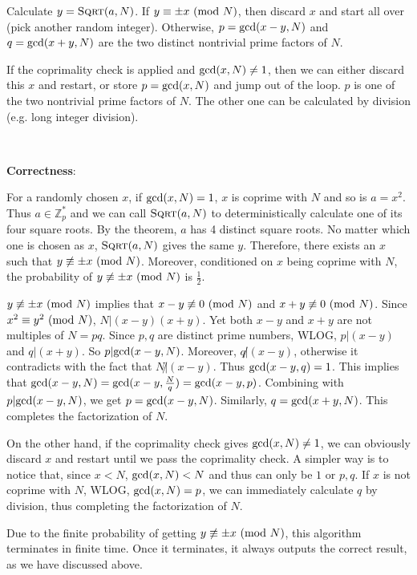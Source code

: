 \documentclass{article}
\begin{document}
Calculate $y=\textsc{Sqrt}(a,N)$. If $y\equiv\pm x\textup{ (mod }N)$, then discard $x$ and start all over (pick another random integer). Otherwise, $p=\textup{gcd}(x-y,N)$ and $q=\textup{gcd}(x+y,N)$ are the two distinct nontrivial prime factors of $N$.

If the coprimality check is applied and $\textup{gcd}(x,N)\neq1$, then we can either discard this $x$ and restart, or store $p=\textup{gcd}(x,N)$ and jump out of the loop. $p$ is one of the two nontrivial prime factors of $N$. The other one can be calculated by division (e.g. long integer division).

~

\noindent\textbf{Correctness}:

For a randomly chosen $x$, if $\textup{gcd}(x,N)=1$, $x$ is coprime with $N$ and so is $a=x^2$. Thus $a\in\mathbb{Z}_p^*$ and we can call $\textsc{Sqrt}(a,N)$ to deterministically calculate one of its four square roots. By the theorem, $a$ has 4 distinct square roots. No matter which one is chosen as $x$, $\textsc{Sqrt}(a,N)$ gives the same $y$. Therefore, there exists an $x$ such that $y\not\equiv\pm x\textup{ (mod }N)$. Moreover, conditioned on $x$ being coprime with $N$, the probability of $y\not\equiv\pm x\textup{ (mod }N)$ is $\frac{1}{2}$.

$y\not\equiv\pm x\textup{ (mod }N)$ implies that $x-y\not\equiv0\textup{ (mod }N)$ and $x+y\not\equiv0\textup{ (mod }N)$. Since $x^2\equiv y^2\textup{ (mod }N)$, $N|(x-y)(x+y)$. Yet both $x-y$ and $x+y$ are not multiples of $N=pq$. Since $p,q$ are distinct prime numbers, WLOG, $p|(x-y)$ and $q|(x+y)$. So $p|\textup{gcd}(x-y,N)$. Moreover, $q\!\!\not|(x-y)$, otherwise it contradicts with the fact that $N\!\!\not|(x-y)$. Thus $\textup{gcd}(x-y,q)=1$. This implies that $\textup{gcd}(x-y,N)=\textup{gcd}(x-y,\frac{N}{q})=\textup{gcd}(x-y,p)$. Combining with $p|\textup{gcd}(x-y,N)$, we get $p=\textup{gcd}(x-y,N)$. Similarly, $q=\textup{gcd}(x+y,N)$. This completes the factorization of $N$.

On the other hand, if the coprimality check gives $\textup{gcd}(x,N)\neq1$, we can obviously discard $x$ and restart until we pass the coprimality check. A simpler way is to notice that, since $x<N$, $\textup{gcd}(x,N)<N$ and thus can only be $1$ or $p,q$. If $x$ is not coprime with $N$, WLOG, $\textup{gcd}(x,N)=p$, we can immediately calculate $q$ by division, thus completing the factorization of $N$.

Due to the finite probability of getting $y\not\equiv\pm x\textup{ (mod }N)$, this algorithm terminates in finite time. Once it terminates, it always outputs the correct result, as we have discussed above.
\end{document}
